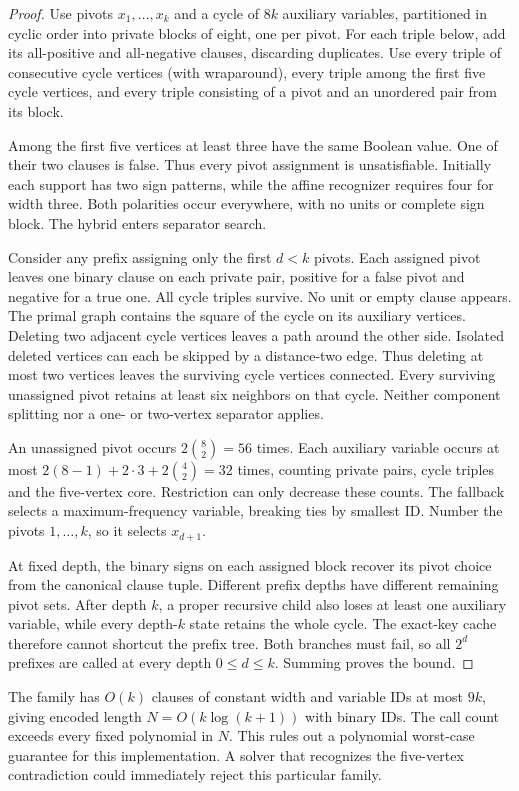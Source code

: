 \documentclass[11pt,a4paper]{article}
\begin{document}
\begin{proof}
Use pivots $x_1,\ldots,x_k$ and a cycle of $8k$ auxiliary variables,
partitioned in cyclic order into private blocks of eight, one per pivot.
For each triple below, add its all-positive and all-negative clauses,
discarding duplicates.
Use every triple of consecutive cycle vertices (with wraparound), every
triple among the first five cycle vertices, and every triple consisting
of a pivot and an unordered pair from its block.

Among the first five vertices at least three have the same Boolean value.
One of their two clauses is false. Thus every pivot assignment is
unsatisfiable. Initially each support has two sign patterns, while the
affine recognizer requires four for width three. Both polarities occur
everywhere, with no units or complete sign block. The hybrid enters
separator search.

Consider any prefix assigning only the first $d<k$ pivots. Each assigned
pivot leaves one binary clause on each private pair, positive for a false
pivot and negative for a true one. All cycle triples survive. No unit or
empty clause appears. The primal graph contains the square of the cycle
on its auxiliary vertices. Deleting two adjacent cycle vertices leaves
a path around the other side. Isolated deleted vertices can each be
skipped by a distance-two edge. Thus deleting at most two vertices leaves
the surviving cycle vertices connected. Every surviving unassigned pivot
retains at least six neighbors on that cycle. Neither component splitting
nor a one- or two-vertex separator applies.

An unassigned pivot occurs $2\binom{8}{2}=56$ times. Each auxiliary
variable occurs at most $2(8-1)+2\cdot3+2\binom{4}{2}=32$ times,
counting private pairs, cycle triples and the five-vertex core.
Restriction can only decrease these counts. The fallback selects a
maximum-frequency variable, breaking ties by smallest ID. Number the
pivots $1,\ldots,k$, so it selects $x_{d+1}$.

At fixed depth, the binary signs on each assigned block recover its
pivot choice from the canonical clause tuple. Different prefix depths
have different remaining pivot sets. After depth $k$, a proper recursive
child also loses at least one auxiliary variable, while every depth-$k$
state retains the whole cycle. The exact-key cache therefore cannot
shortcut the prefix tree. Both branches must fail, so all $2^d$ prefixes
are called at every depth $0\le d\le k$. Summing proves the bound.
\end{proof}
The family has $O(k)$ clauses of constant width and variable IDs at
most $9k$, giving encoded length $N=O(k\log(k+1))$ with binary IDs.
The call count exceeds every fixed polynomial in $N$. This rules out
a polynomial worst-case guarantee for this implementation. A solver
that recognizes the five-vertex contradiction could immediately reject
this particular family.
\end{document}
